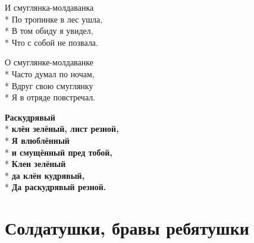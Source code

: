 \medskip

\begin{minipage}{\linewidth}
И смуглянка-молдаванка\\*
По тропинке в лес ушла,\\*
В том обиду я увидел,\\*
Что с собой не позвала.\\
\end{minipage}\par\medskip\nobreak

\medskip

\begin{minipage}{\linewidth}
О смуглянке-молдаванке\\*
Часто думал по ночам,\\*
Вдруг свою смуглянку\\*
Я в отряде повстречал.\\
\end{minipage}\par\medskip\nobreak

\medskip

\begin{minipage}{\linewidth}
\hspace*{1.5em}\textbf{Раскудрявый}\\*
\hspace*{1.5em}\textbf{клён зелёный, лист резной,}\\*
\hspace*{1.5em}\textbf{Я влюблённый}\\*
\hspace*{1.5em}\textbf{и смущённый пред тобой,}\\*
\hspace*{1.5em}\textbf{Клен зелёный}\\*
\hspace*{1.5em}\textbf{да клён кудрявый,}\\*
\hspace*{1.5em}\textbf{Да раскудрявый резной.}\\
\end{minipage}

\vspace{\fill}\newpage

\section{Солдатушки, бравы ребятушки}
\label{song:Солдатушки,_бравы_ребятушки}

\medskip

